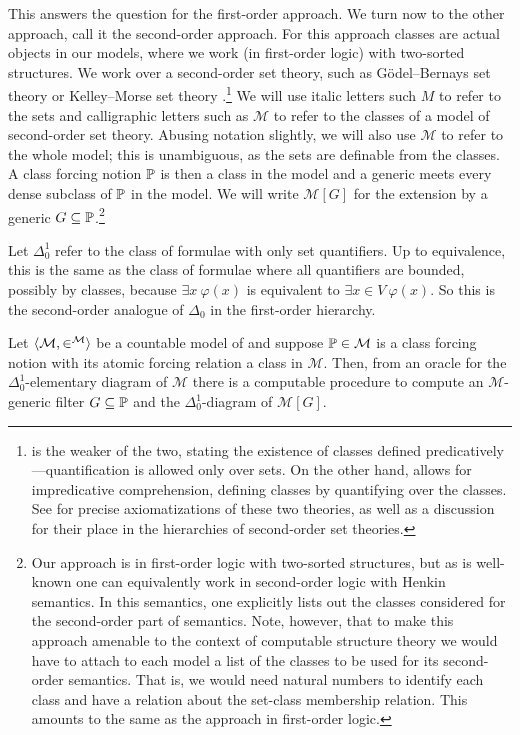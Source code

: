 \documentclass{amsart}
\begin{document}
This answers the question for the first-order approach. We turn now to the other approach, call it the second-order approach. For this approach classes are actual objects in our models, where we work (in first-order logic) with two-sorted structures. We work over a second-order set theory, such as G\"odel--Bernays set theory \GB{} or Kelley--Morse set theory \KM.\footnote{\GB{} is the weaker of the two, stating the existence of classes defined predicatively---quantification is allowed only over sets. On the other hand, \KM{} allows for impredicative comprehension, defining classes by quantifying over the classes. See \cite[Section~2]{williams-min-km} for precise axiomatizations of these two theories, as well as a discussion for their place in the hierarchies of second-order set theories.}
We will use italic letters such $M$ to refer to the sets and calligraphic letters such as $\mathcal M$ to refer to the classes of a model of second-order set theory. Abusing notation slightly, we will also use $\mathcal M$ to refer to the whole model; this is unambiguous, as the sets are definable from the classes. A class forcing notion $\P$ is then a class in the model and a generic meets every dense subclass of $\P$ in the model. We will write $\mathcal M[G]$ for the extension by a generic $G \subseteq \P$.\footnote{Our approach is in first-order logic with two-sorted structures, but as is well-known one can equivalently work in second-order logic with Henkin semantics. In this semantics, one explicitly lists out the classes considered for the second-order part of semantics. Note, however, that to make this approach amenable to the context of computable structure theory we would have to attach to each model a list of the classes to be used for its second-order semantics. That is, we would need natural numbers to identify each class and have a relation about the set-class membership relation. This amounts to the same as the approach in first-order logic.}

Let $\Delta^1_0$ refer to the class of formulae with only set quantifiers. Up to equivalence, this is the same as the class of formulae where all quantifiers are bounded, possibly by classes, because $\exists x\ \varphi(x)$ is equivalent to $\exists x \in V\ \varphi(x)$. So this is the second-order analogue of $\Delta_0$ in the first-order \Levy{} hierarchy.

\begin{theorem}\label{Theorem.Computing-first-order-diagram-for-class-forcing}
Let $\<\mathcal{M},\in^{\mathcal{M}}>$ be a countable model of \GB{} and suppose $\P \in \mathcal M$ is a class forcing notion with its atomic forcing relation a class in $\mathcal M$. Then, from an oracle for the $\Delta^1_0$-elementary diagram of $\mathcal{M}$ there is a computable procedure to compute an $\mathcal{M}$-generic filter $G \subseteq \P$ and the $\Delta^1_0$-diagram of $\mathcal{M}[G]$.
\end{theorem}
\end{document}
